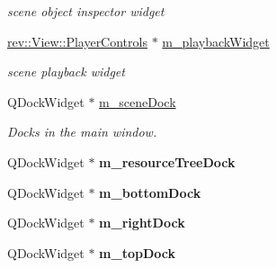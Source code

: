 \begin{Indent}
\begin{DoxyCompactItemize}
\begin{DoxyCompactList}\small\item\em scene object inspector widget \end{DoxyCompactList}\item 
\mbox{\label{classrev_1_1_view_1_1_widget_manager_a271136eef0bd0cdc5b690a45644a68d3}} 
\mbox{\hyperlink{classrev_1_1_view_1_1_player_controls}{rev\+::\+View\+::\+Player\+Controls}} $\ast$ \mbox{\hyperlink{classrev_1_1_view_1_1_widget_manager_a271136eef0bd0cdc5b690a45644a68d3}{m\+\_\+playback\+Widget}}
\begin{DoxyCompactList}\small\item\em scene playback widget \end{DoxyCompactList}\item 
\mbox{\label{classrev_1_1_view_1_1_widget_manager_ac54b96e9104c76e24df81795c7917c00}} 
Q\+Dock\+Widget $\ast$ \mbox{\hyperlink{classrev_1_1_view_1_1_widget_manager_ac54b96e9104c76e24df81795c7917c00}{m\+\_\+scene\+Dock}}
\begin{DoxyCompactList}\small\item\em Docks in the main window. \end{DoxyCompactList}\item 
\mbox{\label{classrev_1_1_view_1_1_widget_manager_aa81838c7b4305f143e69d92a78e3eef8}} 
Q\+Dock\+Widget $\ast$ {\bfseries m\+\_\+resource\+Tree\+Dock}
\item 
\mbox{\label{classrev_1_1_view_1_1_widget_manager_aadac139606a0ae287cf58d28590c92b6}} 
Q\+Dock\+Widget $\ast$ {\bfseries m\+\_\+bottom\+Dock}
\item 
\mbox{\label{classrev_1_1_view_1_1_widget_manager_acd185193421d54be430944ac9bec9cc3}} 
Q\+Dock\+Widget $\ast$ {\bfseries m\+\_\+right\+Dock}
\item 
\mbox{\label{classrev_1_1_view_1_1_widget_manager_a66040d53ac174980fd474684b5c6ad48}} 
Q\+Dock\+Widget $\ast$ {\bfseries m\+\_\+top\+Dock}
\end{DoxyCompactItemize}
\end{Indent}

